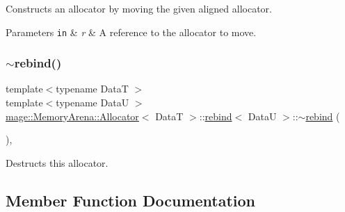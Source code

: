 Constructs an allocator by moving the given aligned allocator.


\begin{DoxyParams}[1]{Parameters}
\mbox{\tt in}  & {\em r} & A reference to the allocator to move. \\
\hline
\end{DoxyParams}
\hypertarget{structmage_1_1_memory_arena_1_1_allocator_1_1rebind_aa16db3ef40f7564d9079ee615239bda5}{}\label{structmage_1_1_memory_arena_1_1_allocator_1_1rebind_aa16db3ef40f7564d9079ee615239bda5} 
\subsubsection{\texorpdfstring{$\sim$rebind()}{~rebind()}}
{\footnotesize\ttfamily template$<$typename DataT $>$ \\
template$<$typename DataU $>$ \\
\hyperlink{structmage_1_1_memory_arena_1_1_allocator}{mage\+::\+Memory\+Arena\+::\+Allocator}$<$ DataT $>$\+::\hyperlink{structmage_1_1_memory_arena_1_1_allocator_1_1rebind}{rebind}$<$ DataU $>$\+::$\sim$\hyperlink{structmage_1_1_memory_arena_1_1_allocator_1_1rebind}{rebind} (\begin{DoxyParamCaption}{ }\end{DoxyParamCaption})\hspace{0.3cm}{\ttfamily [private]}, {\ttfamily [delete]}}

Destructs this allocator. 

\subsection{Member Function Documentation}
\hypertarget{structmage_1_1_memory_arena_1_1_allocator_1_1rebind_abfd04d5a32b3e059168969ee9531fa40}{}\label{structmage_1_1_memory_arena_1_1_allocator_1_1rebind_abfd04d5a32b3e059168969ee9531fa40} 
